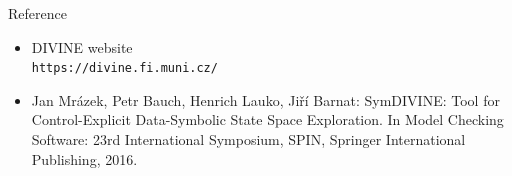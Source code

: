 \documentclass[12pt]{beamer}
\newcommand{\code}[1]{\texttt{#1}}
\begin{document}
\begin{frame}{Reference}
\begin{itemize}
    \item DIVINE website\\
        \code{https://divine.fi.muni.cz/}
    \item Jan Mrázek, Petr Bauch, Henrich Lauko, Jiří Barnat: SymDIVINE: Tool for Control-Explicit Data-Symbolic State Space Exploration. In Model Checking Software: 23rd International Symposium, SPIN, Springer International Publishing, 2016.
\end{itemize}
\end{frame}
\end{document}
